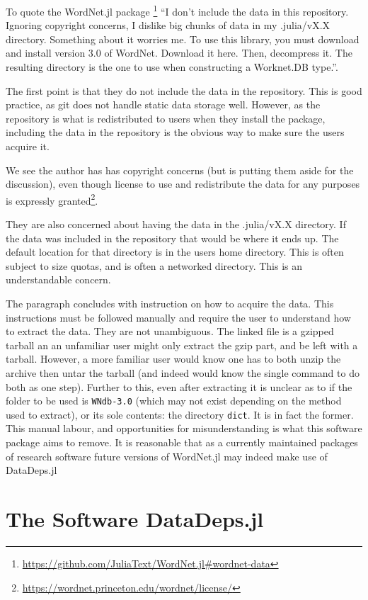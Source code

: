 \documentclass{jors}
\begin{document}
To quote the WordNet.jl package \footnote{\url{https://github.com/JuliaText/WordNet.jl\#wordnet-data}} ``I don't include the data in this repository. Ignoring copyright concerns, I dislike big chunks of data in my .julia/vX.X directory. Something about it worries me. To use this library, you must download and install version 3.0 of WordNet. Download it here. Then, decompress it. The resulting directory is the one to use when constructing a Worknet.DB type.''.


The first point is that they do not include the data in the repository.
This is good practice, as git does not handle static data storage well.
However, as the repository is what is redistributed to users when they install the package,
including the data in the repository is the obvious way to make sure the users acquire it.


We see the author has has copyright concerns (but is putting them aside for the discussion), even though license to use and redistribute the data for any purposes is expressly granted\footnote{\url{https://wordnet.princeton.edu/wordnet/license/}}.

They are also concerned about having the data in the .julia/vX.X directory.
If the data was included in the repository that would be where it ends up.
The default location for that directory is in the users home directory.
This is often subject to size quotas, and is often a networked directory.
This is an understandable concern.

The paragraph concludes with instruction on how to acquire the data.
This instructions must be followed manually and require the user to understand how to extract the data.
They are not unambiguous.
The linked file is a gzipped tarball an an unfamiliar user might only extract the gzip part, and be left with a tarball.
However, a more familiar user would know one has to both unzip the archive then untar the tarball (and indeed would know the single command to do both as one step).
Further to this, even after extracting it is unclear as to if the folder to be used is \texttt{WNdb-3.0} (which may not exist depending on the method used to extract), or its sole contents: the directory \texttt{dict}.
It is in fact the former.
This manual labour, and opportunities for misunderstanding is what this software package aims to remove.
It is reasonable that as a currently maintained packages of research software future versions of WordNet.jl may indeed make use of DataDeps.jl



\section{The Software DataDeps.jl}
\end{document}

